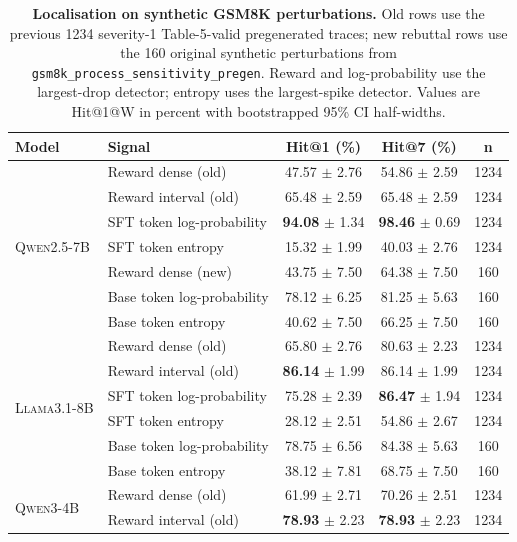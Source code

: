 \begin{table}[t]
\centering
\small
\setlength{\tabcolsep}{5pt}
\caption{\textbf{Localisation on synthetic GSM8K perturbations.} Old rows use the previous 1234 severity-1 Table-5-valid pregenerated traces; new rebuttal rows use the 160 original synthetic perturbations from \texttt{gsm8k\_process\_sensitivity\_pregen}. Reward and log-probability use the largest-drop detector; entropy uses the largest-spike detector. Values are Hit@1@W in percent with bootstrapped 95\% CI half-widths.}
\label{tab:localisation_original_synthetic_rebuttal_hit1_hit7}
\begin{tabular}{llccc}
\toprule
\textbf{Model} & \textbf{Signal} & \textbf{Hit@1 (\%)} & \textbf{Hit@7 (\%)} & \textbf{n} \\
\midrule
\multirow{7}{*}{\textsc{Qwen2.5-7B}} & Reward dense (old) & 47.57 $\pm$ 2.76 & 54.86 $\pm$ 2.59 & 1234 \\
 & Reward interval (old) & 65.48 $\pm$ 2.59 & 65.48 $\pm$ 2.59 & 1234 \\
 & SFT token log-probability & \textbf{94.08} $\pm$ 1.34 & \textbf{98.46} $\pm$ 0.69 & 1234 \\
 & SFT token entropy & 15.32 $\pm$ 1.99 & 40.03 $\pm$ 2.76 & 1234 \\
 & Reward dense (new) & 43.75 $\pm$ 7.50 & 64.38 $\pm$ 7.50 & 160 \\
 & Base token log-probability & 78.12 $\pm$ 6.25 & 81.25 $\pm$ 5.63 & 160 \\
 & Base token entropy & 40.62 $\pm$ 7.50 & 66.25 $\pm$ 7.50 & 160 \\
\midrule
\multirow{6}{*}{\textsc{Llama3.1-8B}} & Reward dense (old) & 65.80 $\pm$ 2.76 & 80.63 $\pm$ 2.23 & 1234 \\
 & Reward interval (old) & \textbf{86.14} $\pm$ 1.99 & 86.14 $\pm$ 1.99 & 1234 \\
 & SFT token log-probability & 75.28 $\pm$ 2.39 & \textbf{86.47} $\pm$ 1.94 & 1234 \\
 & SFT token entropy & 28.12 $\pm$ 2.51 & 54.86 $\pm$ 2.67 & 1234 \\
 & Base token log-probability & 78.75 $\pm$ 6.56 & 84.38 $\pm$ 5.63 & 160 \\
 & Base token entropy & 38.12 $\pm$ 7.81 & 68.75 $\pm$ 7.50 & 160 \\
\midrule
\multirow{6}{*}{\textsc{Qwen3-4B}} & Reward dense (old) & 61.99 $\pm$ 2.71 & 70.26 $\pm$ 2.51 & 1234 \\
 & Reward interval (old) & \textbf{78.93} $\pm$ 2.23 & \textbf{78.93} $\pm$ 2.23 & 1234 \\

\end{tabular}
\end{table}

